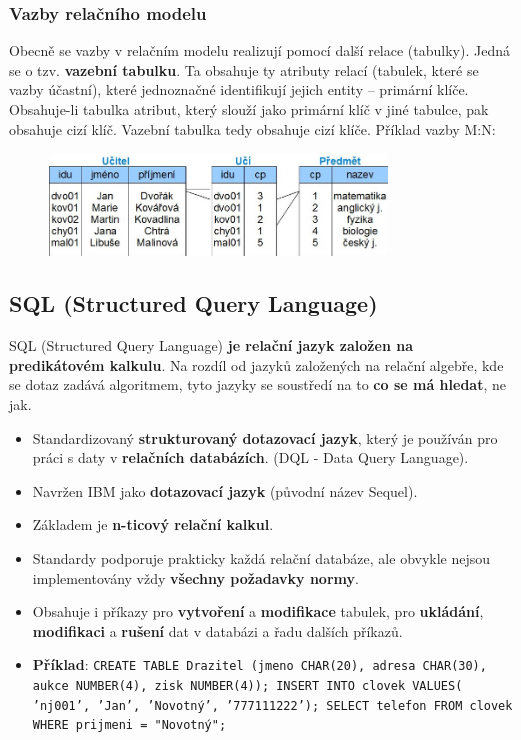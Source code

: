 \subsubsection{Vazby relačního modelu}
Obecně se vazby v relačním modelu realizují pomocí další relace (tabulky). Jedná se o tzv. \textbf{vazební tabulku}. Ta obsahuje ty atributy relací (tabulek, které se vazby účastní), které jednoznačné identifikují jejich entity -- primární klíče. Obsahuje-li tabulka atribut, který slouží jako primární klíč v jiné tabulce, pak obsahuje cizí klíč. Vazební tabulka tedy obsahuje cizí klíče. Příklad vazby M:N:

\begin{figure}[H]
	\centering
	\includegraphics[width=0.8\textwidth]{assets/mn.png}
\end{figure}

\subsection{SQL (Structured Query Language)}
SQL (Structured Query Language) \textbf{je relační jazyk založen na predikátovém kalkulu}. Na rozdíl od jazyků založených na relační algebře, kde se dotaz zadává algoritmem, tyto jazyky se soustředí na to \textbf{co se má hledat}, ne jak.

\begin{itemize}
	\item Standardizovaný\textbf{ strukturovaný dotazovací jazyk}, který je používán pro práci s daty v \textbf{relačních databázích}. (DQL - Data Query Language).
	\item Navržen IBM jako \textbf{dotazovací jazyk} (původní název Sequel).
	\item Základem je \textbf{n-ticový relační kalkul}.
	\item Standardy podporuje prakticky každá relační databáze, ale obvykle nejsou implementovány vždy\textbf{ všechny požadavky normy}.
	\item Obsahuje i příkazy pro \textbf{vytvoření} a \textbf{modifikace} tabulek, pro \textbf{ukládání}, \textbf{modifikaci} a \textbf{rušení} dat v databázi a řadu dalších příkazů.
	\item \textbf{Příklad}: \texttt{CREATE TABLE Drazitel (jmeno CHAR(20), adresa CHAR(30), aukce NUMBER(4), zisk NUMBER(4)); INSERT INTO  clovek VALUES( 'nj001', 'Jan', 'Novotný', '777111222'); SELECT telefon FROM clovek WHERE prijmeni = "Novotný";}
\end{itemize}
